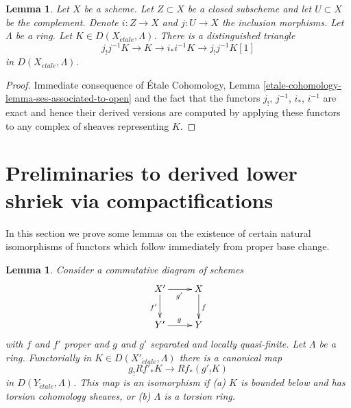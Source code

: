 \documentclass{stacks-project}
\theoremstyle{plain}
\newtheorem{lemma}[subsection]{Lemma}
\theoremstyle{definition}
\theoremstyle{remark}
\numberwithin{equation}{subsection}
\def\etale{{\acute{e}tale}}
\begin{document}
\begin{lemma}
\label{lemma-triangle-associated-to-open}
Let $X$ be a scheme. Let $Z \subset X$ be a closed subscheme and let
$U \subset X$ be the complement. Denote $i : Z \to X$ and $j : U \to X$
the inclusion morphisms. Let $\Lambda$ be a ring.
Let $K \in D(X_\etale, \Lambda)$. There is a distinguished triangle
$$
j_!j^{-1}K \to K \to i_*i^{-1}K \to j_!j^{-1}K[1]
$$
in $D(X_\etale, \Lambda)$.
\end{lemma}

\begin{proof}
Immediate consequence of \'Etale Cohomology, Lemma
\ref{etale-cohomology-lemma-ses-associated-to-open}
and the fact that the functors $j_!$, $j^{-1}$, $i_*$, $i^{-1}$
are exact and hence their derived versions are computed by
applying these functors to any complex of sheaves representing $K$.
\end{proof}





\section{Preliminaries to derived lower shriek via compactifications}
\label{section-prelim}

\noindent
In this section we prove some lemmas on the existence of
certain natural isomorphisms of functors which follow immediately
from proper base change.

\begin{lemma}
\label{lemma-shriek-proper-and-open}
Consider a commutative diagram of schemes
$$
\xymatrix{
X' \ar[r]_{g'} \ar[d]_{f'} & X \ar[d]^f \\
Y' \ar[r]^g & Y
}
$$
with $f$ and $f'$ proper and $g$ and $g'$ separated and locally quasi-finite.
Let $\Lambda$ be a ring. Functorially in $K \in D(X'_\etale, \Lambda)$
there is a canonical map
$$
g_!Rf'_*K \longrightarrow Rf_*(g'_!K)
$$
in $D(Y_\etale, \Lambda)$. This map is an isomorphism if
(a) $K$ is bounded below and has torsion cohomology sheaves, or
(b) $\Lambda$ is a torsion ring.
\end{lemma}
\end{document}
